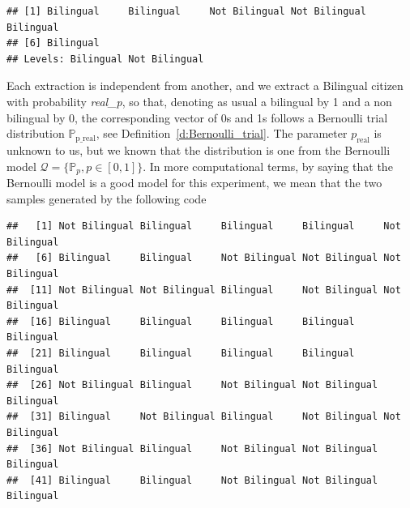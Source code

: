 \begin{example}[Sampling 2]
\begin{knitrout}
\color{fgcolor}\begin{kframe}
\begin{alltt}
 \hlkwb{=} 
 \hlkwb{<-}   
\end{alltt}
\begin{verbatim}
## [1] Bilingual     Bilingual     Not Bilingual Not Bilingual Bilingual    
## [6] Bilingual    
## Levels: Bilingual Not Bilingual
\end{verbatim}
\end{kframe}
\end{knitrout}
		Each extraction is independent from another, and we extract a Bilingual citizen with probability \textit{ real\_p}, so that, denoting as usual a bilingual by 1 and a non bilingual by 0,  the corresponding vector of 0s and 1s follows a Bernoulli trial distribution $\mathbb P_{\text{p\_real}}$, see Definition~\ref{d:Bernoulli_trial}. The parameter $p_{\text{real}}$ is unknown to us, but we known that the distribution is one from the Bernoulli model  $\mathcal Q = \{ \mathbb P_p , p \in [0,1]\}$. 
	In more computational terms, by saying that the Bernoulli model is a good model for this experiment, we mean that the two  samples generated by the following code
\begin{knitrout}
\color{fgcolor}\begin{kframe}
\begin{alltt}
 \hlkwb{<-} 
     
\end{alltt}
\begin{verbatim}
##   [1] Not Bilingual Bilingual     Bilingual     Bilingual     Not Bilingual
##   [6] Bilingual     Bilingual     Not Bilingual Not Bilingual Not Bilingual
##  [11] Not Bilingual Not Bilingual Bilingual     Not Bilingual Not Bilingual
##  [16] Bilingual     Bilingual     Bilingual     Bilingual     Bilingual    
##  [21] Bilingual     Bilingual     Bilingual     Bilingual     Bilingual    
##  [26] Not Bilingual Bilingual     Not Bilingual Not Bilingual Bilingual    
##  [31] Bilingual     Not Bilingual Bilingual     Not Bilingual Not Bilingual
##  [36] Not Bilingual Bilingual     Not Bilingual Not Bilingual Bilingual    
##  [41] Bilingual     Bilingual     Not Bilingual Not Bilingual Bilingual    

\end{verbatim}
\end{kframe}
\end{knitrout}
\end{example}
